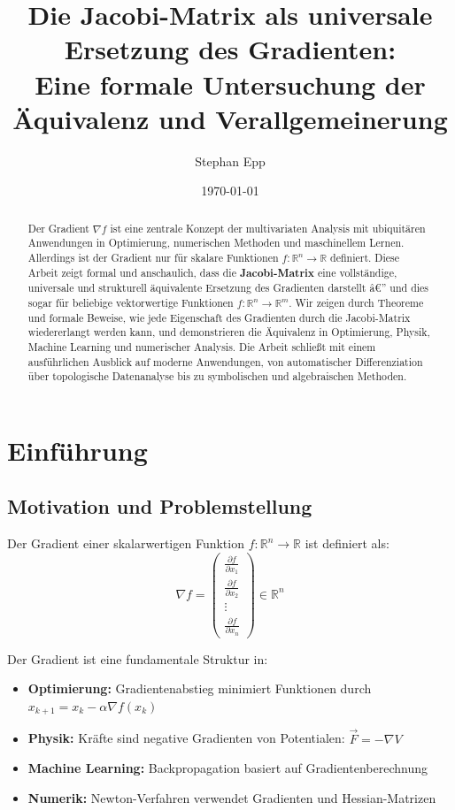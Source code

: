 ﻿\documentclass[a4paper,12pt]{article}
\title{Die Jacobi-Matrix als universale Ersetzung des Gradienten:\\ Eine formale Untersuchung der Äquivalenz und Verallgemeinerung}
\author{Stephan Epp}
\date{\today}
\theoremstyle{definition}
\begin{document}
\maketitle

\begin{abstract}
Der Gradient $\nabla f$ ist eine zentrale Konzept der multivariaten Analysis mit ubiquitären Anwendungen in Optimierung, numerischen Methoden und maschinellem Lernen. Allerdings ist der Gradient nur für skalare Funktionen $f: \mathbb{R}^n \to \mathbb{R}$ definiert. Diese Arbeit zeigt formal und anschaulich, dass die \textbf{Jacobi-Matrix} eine vollständige, universale und strukturell äquivalente Ersetzung des Gradienten darstellt â€” und dies sogar für beliebige vektorwertige Funktionen $f: \mathbb{R}^n \to \mathbb{R}^m$. Wir zeigen durch Theoreme und formale Beweise, wie jede Eigenschaft des Gradienten durch die Jacobi-Matrix wiedererlangt werden kann, und demonstrieren die Äquivalenz in Optimierung, Physik, Machine Learning und numerischer Analysis. Die Arbeit schließt mit einem ausführlichen Ausblick auf moderne Anwendungen, von automatischer Differenziation über topologische Datenanalyse bis zu symbolischen und algebraischen Methoden.
\end{abstract}

\tableofcontents
\newpage

\section{Einführung}

\subsection{Motivation und Problemstellung}

Der Gradient einer skalarwertigen Funktion $f: \mathbb{R}^n \to \mathbb{R}$ ist definiert als:
\[
\nabla f = \begin{pmatrix} \frac{\partial f}{\partial x_1} \\ \frac{\partial f}{\partial x_2} \\ \vdots \\ \frac{\partial f}{\partial x_n} \end{pmatrix} \in \mathbb{R}^n
\]

Der Gradient ist eine fundamentale Struktur in:
\begin{itemize}
	\item \textbf{Optimierung:} Gradientenabstieg minimiert Funktionen durch $x_{k+1} = x_k - \alpha \nabla f(x_k)$
	\item \textbf{Physik:} Kräfte sind negative Gradienten von Potentialen: $\vec{F} = -\nabla V$
	\item \textbf{Machine Learning:} Backpropagation basiert auf Gradientenberechnung
	\item \textbf{Numerik:} Newton-Verfahren verwendet Gradienten und Hessian-Matrizen
\end{itemize}
\end{document}
